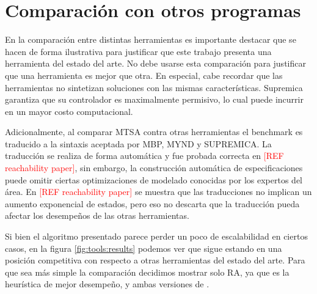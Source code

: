 \section{Comparación con otros programas}

En la comparación entre distintas herramientas es importante destacar que se hacen de forma ilustrativa para justificar que este trabajo presenta una herramienta del estado del arte. No debe usarse esta comparación para justificar que una herramienta es mejor que otra. En especial, cabe recordar que las herramientas no sintetizan soluciones con las mismas características. Supremica garantiza que su controlador es maximalmente permisivo, lo cual puede incurrir en un mayor costo computacional. 

Adicionalmente, al comparar MTSA contra otras herramientas el benchmark es traducido a la sintaxis aceptada por MBP, MYND y SUPREMICA. La traducción se realiza de forma automática y fue probada correcta en \textcolor{red}{[REF reachability paper]}, sin embargo, la construcción automática de especificaciones puede omitir ciertas optimizaciones de modelado conocidas por los expertos del área. En \textcolor{red}{[REF reachability paper]} se muestra que las traducciones no implican un aumento exponencial de estados, pero eso no descarta que la traducción pueda afectar los desempeños de las otras herramientas.

Si bien el algoritmo presentado parece perder un poco de escalabilidad en ciertos casos, en la figura \ref{fig:tools:results} podemos ver que sigue estando en una posición competitiva con respecto a otras herramientas del estado del arte. Para que sea más simple la comparación decidimos mostrar solo RA, ya que es la heurística de mejor desempeño, y ambas versiones de \DCS. 

